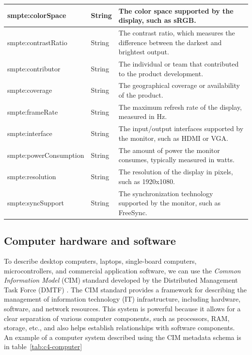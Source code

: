 \begin{longtable}{|p{}|p{}|p{}|}
    \hline
    \scriptsize smpte:colorSpace       & \scriptsize String           & \scriptsize The color space supported by the display, such as sRGB. \\
    \hline
    \scriptsize smpte:contrastRatio    & \scriptsize String           & \scriptsize The contrast ratio, which measures the difference between the darkest and brightest output. \\
    \hline
    \scriptsize smpte:contributor       & \scriptsize String           & \scriptsize The individual or team that contributed to the product development. \\
    \hline
    \scriptsize smpte:coverage          & \scriptsize String           & \scriptsize The geographical coverage or availability of the product. \\
    \hline
    \scriptsize smpte:frameRate        & \scriptsize String           & \scriptsize The maximum refresh rate of the display, measured in Hz. \\
    \hline
    \scriptsize smpte:interface         & \scriptsize String           & \scriptsize The input/output interfaces supported by the monitor, such as HDMI or VGA. \\
    \hline
    \scriptsize smpte:powerConsumption & \scriptsize String           & \scriptsize The amount of power the monitor consumes, typically measured in watts. \\
    \hline
    \scriptsize smpte:resolution        & \scriptsize String           & \scriptsize The resolution of the display in pixels, such as 1920x1080. \\
    \hline
    \scriptsize smpte:syncSupport      & \scriptsize String           & \scriptsize The synchronization technology supported by the monitor, such as FreeSync. \\
    \hline

\end{longtable}


\subsection{Computer hardware and software}
To describe desktop computers, laptops, single-board computers, microcontrollers, and commercial application software, we can use the \textit{Common Information Model} (CIM) standard developed by the Distributed Management Task Force (DMTF) \cite{CIM}. The CIM standard provides a framework for describing the management of information technology (IT) infrastructure, including hardware, software, and network resources. This system is powerful because it allows for a clear separation of various computer components, such as processors, RAM, storage, etc., and also helps establish relationships with software components.\\
An example of a computer system described using the CIM metadata schema is in table~\ref{tab:c4-computer}

